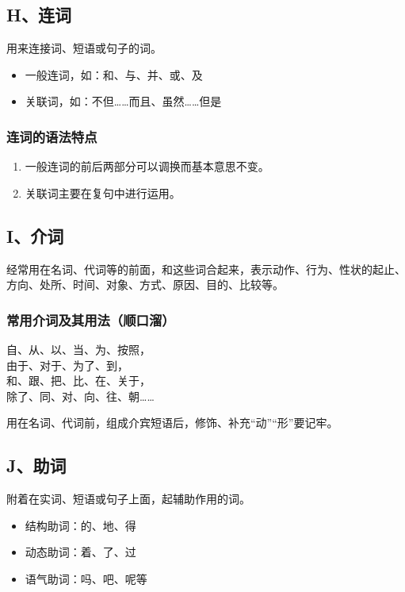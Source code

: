 \subsection{H、连词}
用来连接词、短语或句子的词。

\begin{itemize}
    \item 一般连词，如：和、与、并、或、及
    \item 关联词，如：不但……而且、虽然……但是
\end{itemize}

\subsubsection*{连词的语法特点}
\begin{enumerate}
    \item 一般连词的前后两部分可以调换而基本意思不变。
    \item 关联词主要在复句中进行运用。
\end{enumerate}

\subsection{I、介词}
经常用在名词、代词等的前面，和这些词合起来，表示动作、行为、性状的起止、方向、处所、时间、对象、方式、原因、目的、比较等。

\subsubsection*{常用介词及其用法（顺口溜）}
\begin{center}
    自、从、以、当、为、按照，\\
    由于、对于、为了、到，\\
    和、跟、把、比、在、关于，\\
    除了、同、对、向、往、朝……
\end{center}

用在名词、代词前，组成介宾短语后，修饰、补充“动”“形”要记牢。

\subsection{J、助词}
附着在实词、短语或句子上面，起辅助作用的词。

\begin{itemize}
    \item 结构助词：的、地、得
    \item 动态助词：着、了、过
    \item 语气助词：吗、吧、呢等
\end{itemize}


